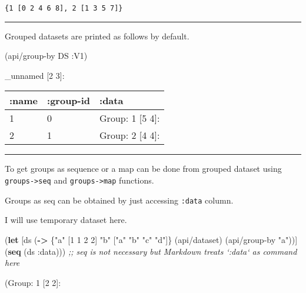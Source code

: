\documentclass[]{article}
\newenvironment{Shaded}{\begin{snugshade}}{\end{snugshade}}
\newcommand{\KeywordTok}[1]{\textcolor[rgb]{0.13,0.29,0.53}{\textbf{#1}}}
\newcommand{\DecValTok}[1]{\textcolor[rgb]{0.00,0.00,0.81}{#1}}
\newcommand{\StringTok}[1]{\textcolor[rgb]{0.31,0.60,0.02}{#1}}
\newcommand{\CommentTok}[1]{\textcolor[rgb]{0.56,0.35,0.01}{\textit{#1}}}
\newcommand{\AttributeTok}[1]{\textcolor[rgb]{0.77,0.63,0.00}{#1}}
\newcommand{\NormalTok}[1]{#1}
\begin{document}
\begin{verbatim}
{1 [0 2 4 6 8], 2 [1 3 5 7]}
\end{verbatim}

\begin{center}\rule{0.5\linewidth}{0.5pt}\end{center}

Grouped datasets are printed as follows by default.

\begin{Shaded}
\begin{Highlighting}[]
\NormalTok{(api/group-by DS }\AttributeTok{:V1}\NormalTok{)}
\end{Highlighting}
\end{Shaded}

\_unnamed {[}2 3{]}:

\begin{longtable}[]{@{}lll@{}}
\toprule
:name & :group-id & :data\tabularnewline
\midrule
\endhead
1 & 0 & Group: 1 {[}5 4{]}:\tabularnewline
2 & 1 & Group: 2 {[}4 4{]}:\tabularnewline
\bottomrule
\end{longtable}

\begin{center}\rule{0.5\linewidth}{0.5pt}\end{center}

To get groups as sequence or a map can be done from grouped dataset
using \texttt{groups-\textgreater{}seq} and
\texttt{groups-\textgreater{}map} functions.

Groups as seq can be obtained by just accessing \texttt{:data} column.

I will use temporary dataset here.

\begin{Shaded}
\begin{Highlighting}[]
\NormalTok{(}\KeywordTok{let}\NormalTok{ [ds (}\KeywordTok{->}\NormalTok{ \{}\StringTok{"a"}\NormalTok{ [}\DecValTok{1} \DecValTok{1} \DecValTok{2} \DecValTok{2}\NormalTok{]}
              \StringTok{"b"}\NormalTok{ [}\StringTok{"a"} \StringTok{"b"} \StringTok{"c"} \StringTok{"d"}\NormalTok{]\}}
\NormalTok{             (api/dataset)}
\NormalTok{             (api/group-by }\StringTok{"a"}\NormalTok{))]}
\NormalTok{  (}\KeywordTok{seq}\NormalTok{ (ds }\AttributeTok{:data}\NormalTok{))) }\CommentTok{;; seq is not necessary but Markdown treats `:data` as command here}
\end{Highlighting}
\end{Shaded}

(Group: 1 {[}2 2{]}:
\end{document}
